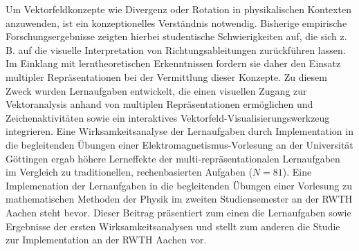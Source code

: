 \documentclass{scdpg}
\begin{document}
\begin{scAbstract}
{}
\scBeginText
%
Um Vektorfeldkonzepte wie Divergenz oder Rotation in physikalischen
Kontexten anzuwenden, ist ein konzeptionelles Verständnis
notwendig. Bisherige empirische Forschungsergebnisse zeigten hierbei
studentische Schwierigkeiten auf, die sich z. B. auf die visuelle
Interpretation von Richtungsableitungen zurückführen lassen. Im
Einklang mit lerntheoretischen Erkenntnissen fordern sie daher den
Einsatz multipler Repräsentationen bei der Vermittlung dieser
Konzepte. Zu diesem Zweck wurden Lernaufgaben entwickelt, die einen
visuellen Zugang zur Vektoranalysis anhand von multiplen
Repräsentationen ermöglichen und Zeichenaktivitäten sowie ein
interaktives Vektorfeld-Visualisierungswerkzeug integrieren. Eine
Wirksamkeitsanalyse der Lernaufgaben durch Implementation in die
begleitenden Übungen einer Elektromagnetismus-Vorlesung an der
Universität Göttingen ergab höhere Lerneffekte der
multi-repräsentationalen Lernaufgaben im Vergleich zu traditionellen,
rechenbasierten Aufgaben ($N=81$). Eine Implemenation der Lernaufgaben
in die begleitenden Übungen einer Vorlesung zu mathematischen Methoden
der Physik im zweiten Studiensemester an der RWTH Aachen steht
bevor. Dieser Beitrag präsentiert zum einen die Lernaufgaben sowie
Ergebnisse der ersten Wirksamkeitsanalysen und stellt zum anderen die
Studie zur Implementation an der RWTH Aachen vor.
%
\scEndText
{}
\end{scAbstract}
\end{document}

